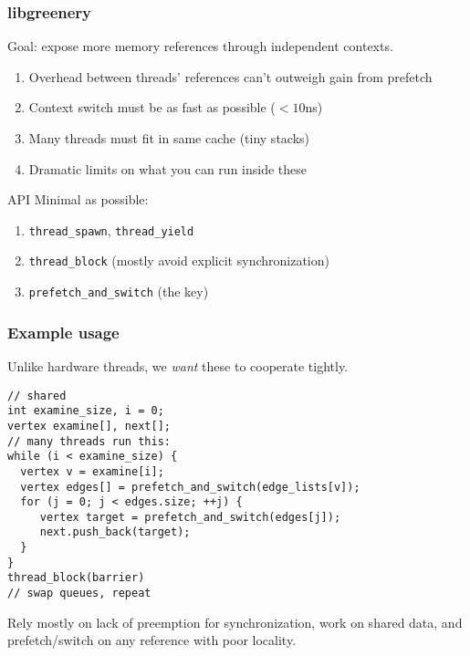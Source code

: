 \documentclass{beamer}
\begin{document}
\begin{frame}
\frametitle{libgreenery}
Goal: expose more memory references through independent contexts.
\begin{enumerate}
  \item Overhead between threads' references can't outweigh gain from prefetch
  \item Context switch must be as fast as possible ($<10$ns)
  \item Many threads must fit in same cache (tiny stacks)
  \item Dramatic limits on what you can run inside these
  \end{enumerate}
\begin{block}{API}
  Minimal as possible:
  \begin{enumerate}
  \item \texttt{thread\_spawn}, \texttt{thread\_yield}
  \item \texttt{thread\_block} (mostly avoid explicit synchronization)
  \item \texttt{prefetch\_and\_switch} (the key)
  \end{enumerate}
\end{block}
\end{frame}
\begin{frame}[fragile]
  \frametitle{Example usage}
Unlike hardware threads, we \emph{want} these to cooperate tightly.
\begin{lstlisting}
// shared
int examine_size, i = 0;
vertex examine[], next[];
// many threads run this:
while (i < examine_size) {
  vertex v = examine[i];
  vertex edges[] = prefetch_and_switch(edge_lists[v]);
  for (j = 0; j < edges.size; ++j) {
     vertex target = prefetch_and_switch(edges[j]);
     next.push_back(target);
  }
}
thread_block(barrier)
// swap queues, repeat
\end{lstlisting}
Rely mostly on lack of preemption for synchronization, work on shared
data, and prefetch/switch on any reference with poor locality.
\end{frame}
\end{document}
